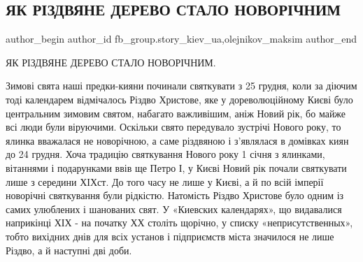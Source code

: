  
 
 
 
 
 
\subsection{ЯК РІЗДВЯНЕ ДЕРЕВО СТАЛО НОВОРІЧНИМ}
\label{sec:30_12_2021.fb.fb_group.story_kiev_ua.1.rizdvo_derevo}
 
\ifcmt
 author_begin
   author_id fb_group.story_kiev_ua,olejnikov_maksim
 author_end
\fi

ЯК РІЗДВЯНЕ ДЕРЕВО СТАЛО НОВОРІЧНИМ.


Зимові свята наші предки-кияни починали святкувати з 25 грудня, коли за діючим
тоді календарем відмічалось Різдво Христове, яке у дореволюційному Києві було
центральним зимовим святом, набагато важливішим, аніж Новий рік, бо майже всі
люди були віруючими. Оскільки свято передувало зустрічі Нового року, то ялинка
вважалася не новорічною, а саме різдвяною і з’являлася в домівках киян до 24
грудня. Хоча традицію святкування Нового року 1 січня з ялинками, вітаннями і
подарунками ввів ще Петро І, у Києві Новий рік почали святкувати лише з
середини ХІХст. До того часу не лише у Києві, а й по всій імперії новорічні
святкування були рідкістю. Натомість Різдво Христове було одним із самих
улюблених і шанованих свят. У «Киевских календарях», що видавалися наприкінці
ХІХ - на початку ХХ століть щорічно, у списку «неприсутственных», тобто
вихідних днів для всіх установ і підприємств міста значилося не лише Різдво, а
й наступні дві доби. 

\begin{multicols}{2} %
\setlength{\parindent}{0pt}


\end{multicols} %

